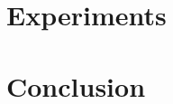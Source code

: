 \documentclass[conference,a4paper]{IEEEtran}
\begin{document}
	\section{Experiments}       \label{sec:Experiments}     

	\section{Conclusion}        \label{sec:Conclusion}      


	\newpage

%        
%        

	\begin{spacing}{0.84}
		
		
    \end{spacing}
\end{document}
